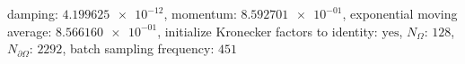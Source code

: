 damping: $\num[scientific-notation=true]{4.199625e-12}$, momentum: $\num[scientific-notation=true]{8.592701e-01}$, exponential moving average: $\num[scientific-notation=true]{8.566160e-01}$, initialize Kronecker factors to identity: $\text{yes}$, $N_{\Omega}$: $\num[scientific-notation=false]{128}$, $N_{\partial\Omega}$: $\num[scientific-notation=false]{2292}$, batch sampling frequency: $\num[scientific-notation=false]{451}$